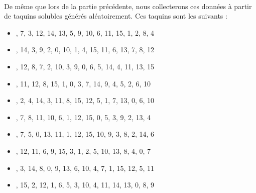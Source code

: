 \documentclass[10pt,a4paper]{report}
\begin{document}
\paragraph{}{De même que lors de la partie précédente, nous collecterons ces données à partir de taquins solubles générés aléatoirement. Ces taquins sont les suivants : }
\begin{itemize}
\item {\ttfamily{}, 7, 3, 12, 14, 13, 5, 9, 10, 6, 11, 15, 1, 2, 8, 4\rbrack}
\item {\ttfamily{}, 14, 3, 9, 2, 0, 10, 1, 4, 15, 11, 6, 13, 7, 8, 12\rbrack}
\item {\ttfamily{}, 12, 8, 7, 2, 10, 3, 9, 0, 6, 5, 14, 4, 11, 13, 15\rbrack}
\item {\ttfamily{}, 11, 12, 8, 15, 1, 0, 3, 7, 14, 9, 4, 5, 2, 6, 10\rbrack}
\item {\ttfamily{}, 2, 4, 14, 3, 11, 8, 15, 12, 5, 1, 7, 13, 0, 6, 10\rbrack}
\item {\ttfamily{}, 7, 8, 11, 10, 6, 1, 12, 15, 0, 5, 3, 9, 2, 13, 4\rbrack}
\item {\ttfamily{}, 7, 5, 0, 13, 11, 1, 12, 15, 10, 9, 3, 8, 2, 14, 6\rbrack}
\item {\ttfamily{}, 12, 11, 6, 9, 15, 3, 1, 2, 5, 10, 13, 8, 4, 0, 7\rbrack}
\item {\ttfamily{}, 3, 14, 8, 0, 9, 13, 6, 10, 4, 7, 1, 15, 12, 5, 11\rbrack}
\item {\ttfamily{}, 15, 2, 12, 1, 6, 5, 3, 10, 4, 11, 14, 13, 0, 8, 9\rbrack}
\end{itemize}
\end{document}
